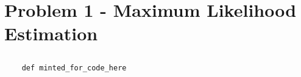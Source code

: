 \section{Problem 1 - Maximum Likelihood Estimation}
\subsection{}

\begin{verbatim}
    def minted_for_code_here
\end{verbatim}


